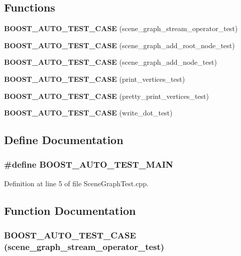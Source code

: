 \subsection*{Functions}
\begin{CompactItemize}
\item 
{\bf BOOST\_\-AUTO\_\-TEST\_\-CASE} (scene\_\-graph\_\-stream\_\-operator\_\-test)
\item 
{\bf BOOST\_\-AUTO\_\-TEST\_\-CASE} (scene\_\-graph\_\-add\_\-root\_\-node\_\-test)
\item 
{\bf BOOST\_\-AUTO\_\-TEST\_\-CASE} (scene\_\-graph\_\-add\_\-node\_\-test)
\item 
{\bf BOOST\_\-AUTO\_\-TEST\_\-CASE} (print\_\-vertices\_\-test)
\item 
{\bf BOOST\_\-AUTO\_\-TEST\_\-CASE} (pretty\_\-print\_\-vertices\_\-test)
\item 
{\bf BOOST\_\-AUTO\_\-TEST\_\-CASE} (write\_\-dot\_\-test)
\end{CompactItemize}


\subsection{Define Documentation}
\subsubsection{\setlength{\rightskip}{0pt plus 5cm}\#define BOOST\_\-AUTO\_\-TEST\_\-MAIN}\label{SceneGraphTest_8cpp_f00c3bd56a2dfa707b0534a7e1670af4}




Definition at line 5 of file SceneGraphTest.cpp.

\subsection{Function Documentation}
\subsubsection{\setlength{\rightskip}{0pt plus 5cm}BOOST\_\-AUTO\_\-TEST\_\-CASE (scene\_\-graph\_\-stream\_\-operator\_\-test)}\label{SceneGraphTest_8cpp_695bba67b053a15614907b5a5a9865f4}




